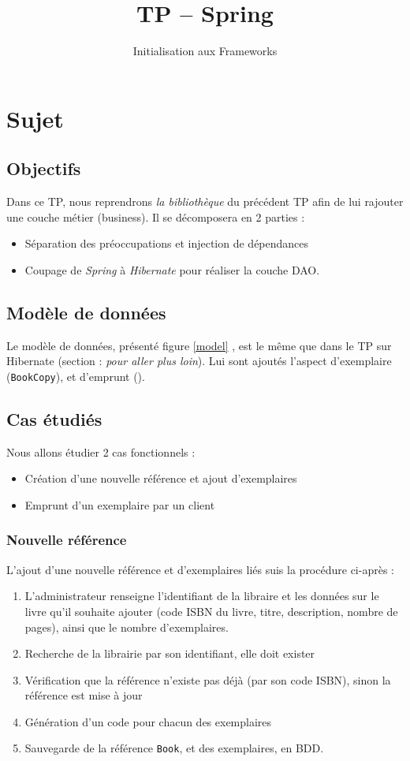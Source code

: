 \documentclass[small,algo]{dushClass}
\title{TP -- Spring}
\subtitle{Initialisation aux Frameworks}
\begin{document}
\section{Sujet}

\subsection{Objectifs}

Dans ce TP, nous reprendrons \emph{la bibliothèque} du précédent TP afin de lui rajouter une couche métier (business). Il se décomposera en 2 parties : 
\begin{itemize}
\item Séparation des préoccupations et injection de dépendances
\item Coupage de \emph{Spring} à \emph{Hibernate} pour réaliser la couche DAO.
\end{itemize}

\subsection{Modèle de données}

Le modèle de données, présenté figure \ref{model} , est le même que dans le TP sur Hibernate (section : \emph{pour aller plus loin}). Lui sont ajoutés l'aspect d'exemplaire (\texttt{BookCopy}), et d'emprunt ().

\subsection{Cas étudiés}

Nous allons étudier 2 cas fonctionnels :
\begin{itemize}
\item Création d'une nouvelle référence et ajout d'exemplaires
\item Emprunt d'un exemplaire par un client%
\end{itemize}

\subsubsection{Nouvelle référence}
L'ajout d'une nouvelle référence et d'exemplaires liés suis la procédure ci-après :
\begin{enumerate}
\item\label{add-ihm} L'administrateur renseigne l'identifiant de la libraire et les données sur le livre qu'il souhaite ajouter (code ISBN du livre, titre, description, nombre de pages), ainsi que le nombre d'exemplaires.
\item Recherche de la librairie par son identifiant, elle doit exister
\item Vérification que la référence n'existe pas déjà (par son code ISBN), sinon la référence est mise à jour
\item Génération d'un code pour chacun des exemplaires
\item Sauvegarde de la référence \texttt{Book}, et des exemplaires, en BDD.\\
\end{enumerate}
\end{document}
